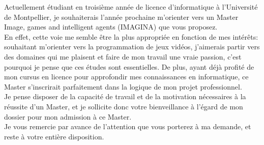\documentclass[a4paper]{moderncv}
\date{Le 09 Février 2017}
\begin{document}
\makelettertitle

Actuellement étudiant en troisième année de licence d'informatique à l'Université de Montpellier, je souhaiterais l'année prochaine m'orienter vers un Master Image, games and intelligent agents (IMAGINA) que vous proposez.
\\En effet, cette voie me semble être la plus appropriée en fonction de mes intérêts: souhaitant m'orienter vers la programmation de jeux vidéos, j'aimerais partir vers des domaines qui me plaisent et faire de mon travail une vraie passion, c'est pourquoi je pense que ces études sont essentielles. De plus, ayant déjà profité de mon cursus en licence pour approfondir mes connaissances en informatique, ce Master s’inscrirait parfaitement dans la logique de mon projet professionnel.
\\Je pense disposer de la capacité de travail et de la motivation nécessaires à la réussite d’un Master, et je sollicite donc votre bienveillance à l’égard de mon dossier pour mon admission à ce Master.
\\Je vous remercie par avance de l'attention que vous porterez à ma demande, et reste à votre entière disposition.

\makeletterclosing
\end{document}
